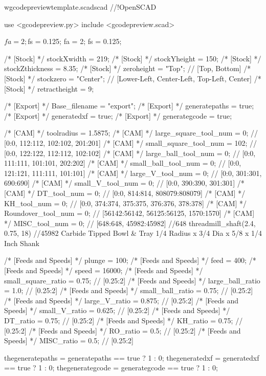 \documentclass{ltxdoc}
\begin{document}
\lstset{firstnumber=1}%
\begin{writecode}{w}{gcodepreviewtemplate.scad}{scad}
//!OpenSCAD

use <gcodepreview.py>
include <gcodepreview.scad>

$fa = 2;
$fs = 0.125;
fa = 2;
fs = 0.125;

/* [Stock] */
stockXwidth = 219;
/* [Stock] */
stockYheight = 150;
/* [Stock] */
stockZthickness = 8.35;
/* [Stock] */
zeroheight = "Top"; // [Top, Bottom]
/* [Stock] */
stockzero = "Center"; // [Lower-Left, Center-Left, Top-Left, Center]
/* [Stock] */
retractheight = 9;

/* [Export] */
Base_filename = "export"; 
/* [Export] */
generatepaths = true; 
/* [Export] */
generatedxf = true; 
/* [Export] */
generategcode = true; 

/* [CAM] */
toolradius = 1.5875;
/* [CAM] */
large_square_tool_num = 0; // [0:0, 112:112, 102:102, 201:201]
/* [CAM] */
small_square_tool_num = 102; // [0:0, 122:122, 112:112, 102:102]
/* [CAM] */
large_ball_tool_num = 0; // [0:0, 111:111, 101:101, 202:202]
/* [CAM] */
small_ball_tool_num = 0; // [0:0, 121:121, 111:111, 101:101]
/* [CAM] */
large_V_tool_num = 0; // [0:0, 301:301, 690:690]
/* [CAM] */
small_V_tool_num = 0; // [0:0, 390:390, 301:301]
/* [CAM] */
DT_tool_num = 0; // [0:0, 814:814, 808079:808079]
/* [CAM] */
KH_tool_num = 0; // [0:0, 374:374, 375:375, 376:376, 378:378]
/* [CAM] */
Roundover_tool_num = 0; // [56142:56142, 56125:56125, 1570:1570]
/* [CAM] */
MISC_tool_num = 0; // [648:648, 45982:45982]
//648 threadmill_shaft(2.4, 0.75, 18)
//45982 Carbide Tipped Bowl & Tray 1/4 Radius x 3/4 Dia x 5/8 x 1/4 Inch Shank

/* [Feeds and Speeds] */
plunge = 100;
/* [Feeds and Speeds] */
feed = 400;
/* [Feeds and Speeds] */
speed = 16000;
/* [Feeds and Speeds] */
small_square_ratio = 0.75; // [0.25:2]
/* [Feeds and Speeds] */
large_ball_ratio = 1.0; // [0.25:2]
/* [Feeds and Speeds] */
small_ball_ratio = 0.75; // [0.25:2]
/* [Feeds and Speeds] */
large_V_ratio = 0.875; // [0.25:2]
/* [Feeds and Speeds] */
small_V_ratio = 0.625; // [0.25:2]
/* [Feeds and Speeds] */
DT_ratio = 0.75; // [0.25:2]
/* [Feeds and Speeds] */
KH_ratio = 0.75; // [0.25:2]
/* [Feeds and Speeds] */
RO_ratio = 0.5; // [0.25:2]
/* [Feeds and Speeds] */
MISC_ratio = 0.5; // [0.25:2]

thegeneratepaths = generatepaths == true ? 1 : 0;
thegeneratedxf = generatedxf == true ? 1 : 0;
thegenerategcode = generategcode == true ? 1 : 0;


\end{writecode}
\end{document}
